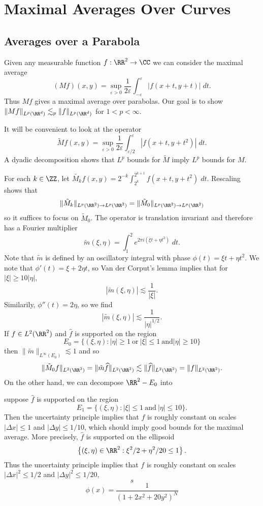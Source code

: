 \chapter{Maximal Averages Over Curves}

\section{Averages over a Parabola}

Given any measurable function $f: \RR^2 \to \CC$ we can consider the maximal average
%
\[ (Mf)(x,y) = \sup_{\varepsilon > 0} \frac{1}{2\varepsilon} \int_{-\varepsilon}^\varepsilon|f(x+t,y+t)|\; dt. \]
%
Thus $Mf$ gives a maximal average over parabolas. Our goal is to show $\| Mf \|_{L^p(\RR^d)} \lesssim_p \| f \|_{L^p(\RR^d)}$ for $1 < p < \infty$.

It will be convenient to look at the operator
%
\[ \tilde{M} f(x,y) = \sup_{\varepsilon > 0} \frac{1}{2\varepsilon} \int_{\varepsilon/2}^{\varepsilon} |f(x+t,y+t^2)|\; dt. \]
%
A dyadic decomposition shows that $L^p$ bounds for $\tilde{M}$ imply $L^p$ bounds for $M$.

For each $k \in \ZZ$, let $\tilde{M_k} f(x,y) = 2^{-k} \int_{2^k}^{2^{k+1}} f(x+t,y+t^2)\; dt$. Rescaling shows that
%
\[ \| \tilde{M}_k \|_{L^p(\RR^2) \to L^p(\RR^2)} = \| \tilde{M}_0 \|_{L^p(\RR^2) \to L^p(\RR^2)} \]
%
so it suffices to focus on $\tilde{M}_0$. The operator is translation invariant and therefore has a Fourier multiplier
%
\[ \tilde{m}(\xi,\eta) = \int_1^2 e^{2 \pi i (\xi t + \eta t^2)}\; dt. \]
%
Note that $\tilde{m}$ is defined by an oscillatory integral with phase $\phi(t) = \xi t + \eta t^2$. We note that $\phi'(t) = \xi + 2 \eta t$, so Van der Corput's lemma implies that for $|\xi| \geq 10|\eta|$,
%
\[ |\tilde{m}(\xi,\eta)| \lesssim \frac{1}{|\xi|}. \]
%
Similarily, $\phi''(t) = 2 \eta$, so we find
%
\[ |\tilde{m}(\xi,\eta)| \lesssim \frac{1}{|\eta|^{1/2}}. \]
%
If $f \in L^2(\RR^2)$ and $\widehat{f}$ is supported on the region
%
\[ E_0 = \{ (\xi,\eta) : |\eta| \geq 1\ \text{or}\ |\xi| \leq 1\ \text{and} |\eta| \geq 10 \} \]
%
then $\| \tilde{m} \|_{L^\infty(E_0)} \lesssim 1$ and so
%
\[ \| \tilde{M}_0 f \|_{L^2(\RR^2)} = \| \tilde{m} \widehat{f} \|_{L^2(\RR^2)} \lesssim \| \widehat{f} \|_{L^2(\RR^2)} = \| f \|_{L^2(\RR^2)}. \]
%
On the other hand, we can decompose $\RR^2 - E_0$ into

suppose $\widehat{f}$ is supported on the region
%
\[ E_1 = \{ (\xi,\eta) : |\xi| \leq 1\ \text{and}\ |\eta| \leq 10 \}. \]
%
Then the uncertainty principle implies that $f$ is roughly constant on scales $|\Delta x| \leq 1$ and $|\Delta y| \leq 1/10$, which should imply good bounds for the maximal average. More precisely, $\widehat{f}$ is supported on the ellipsoid
%
\[ \left\{ (\xi,\eta) \in \RR^2 : \xi^2/2 + \eta^2/20 \leq 1 \right\}. \]
%
Thus the uncertainty principle implies that $f$ is roughly constant on scales $|\Delta x|^2 \leq 1/2$ and $|\Delta y|^2 \leq 1/20$,
%
\[ s \]
%
\[ \phi(x) = \frac{1}{( 1 + 2 x^2 + 20 y^2 )^N} \]
